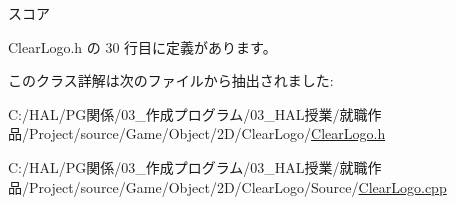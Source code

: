 スコア 



 Clear\+Logo.\+h の 30 行目に定義があります。



このクラス詳解は次のファイルから抽出されました\+:\begin{DoxyCompactItemize}
\item 
C\+:/\+H\+A\+L/\+P\+G関係/03\+\_\+作成プログラム/03\+\_\+\+H\+A\+L授業/就職作品/\+Project/source/\+Game/\+Object/2\+D/\+Clear\+Logo/\mbox{\hyperlink{_clear_logo_8h}{Clear\+Logo.\+h}}\item 
C\+:/\+H\+A\+L/\+P\+G関係/03\+\_\+作成プログラム/03\+\_\+\+H\+A\+L授業/就職作品/\+Project/source/\+Game/\+Object/2\+D/\+Clear\+Logo/\+Source/\mbox{\hyperlink{_clear_logo_8cpp}{Clear\+Logo.\+cpp}}\end{DoxyCompactItemize}
